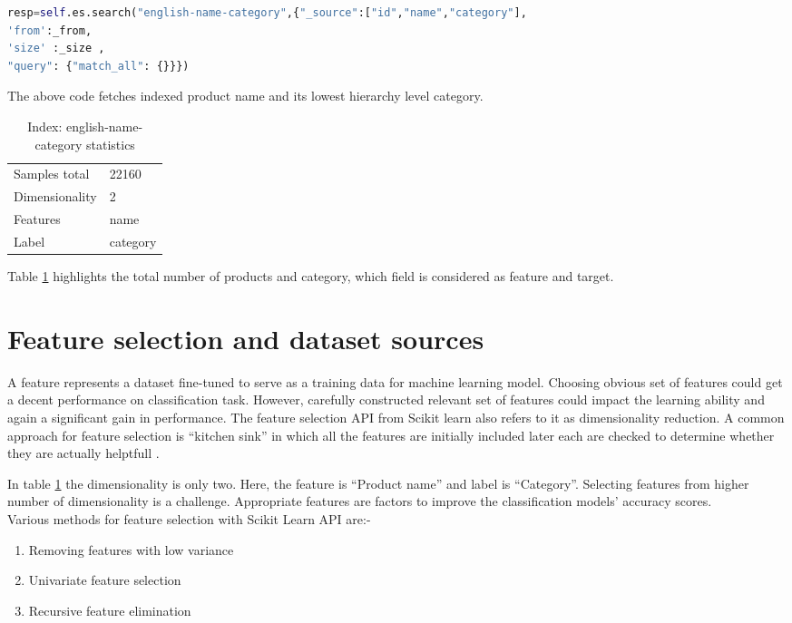 \begin{lstlisting}[language=Python]
resp=self.es.search("english-name-category",{"_source":["id","name","category"],
'from':_from,
'size' :_size ,
"query": {"match_all": {}}})
\end{lstlisting}

The above code fetches indexed product name and its lowest hierarchy level category.  
\begin{table}[h]
      \caption{Index: english-name-category statistics}
      \centering
      \label{table:enc}
\begin{tabular}{ll}
      \toprule 

      Samples total&22160 \\
      Dimensionality&2 \\
      Features&name \\
      Label&category \\
      
      \bottomrule
\end{tabular}
\end{table}

Table \ref{table:enc} highlights the total number of products and category, which field is considered as feature and target. 

\section {Feature selection and dataset sources} \label{sec:feature-selection}

A feature represents a dataset fine-tuned to serve as a training data for machine learning model. Choosing obvious set of features could get a decent performance on classification task. However, carefully constructed relevant set of features could impact the learning ability and again a significant gain in performance. The feature selection API from Scikit learn \parencite{sklearn_api} also refers to it as dimensionality reduction. A common approach for feature selection is ``kitchen sink''  in which all the features are initially included later each are checked to determine whether they are actually helptfull \parencite{BirdKleinLoper09}.

In table \ref{table:enc} the dimensionality is only two. Here, the feature is ``Product name'' and label is ``Category''. Selecting features from higher number of dimensionality is a challenge. Appropriate features are factors to improve the classification models' accuracy scores.\\ 
Various methods for feature selection with Scikit Learn API are:-
\begin{enumerate}
      \item Removing features with low variance
      \item Univariate feature selection
      \item Recursive feature elimination

\end{enumerate}

